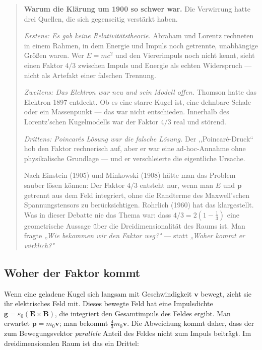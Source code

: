 \begin{quote}
\textbf{Warum die Klärung um 1900 so schwer war.}
Die Verwirrung hatte drei Quellen, die sich gegenseitig verstärkt haben.

\emph{Erstens: Es gab keine Relativitätstheorie.} Abraham und Lorentz
rechneten in einem Rahmen, in dem Energie und Impuls noch getrennte,
unabhängige Größen waren. Wer $E = mc^2$ und den Viererimpuls noch nicht
kennt, sieht einen Faktor $4/3$ zwischen Impuls und Energie als echten
Widerspruch --- nicht als Artefakt einer falschen Trennung.

\emph{Zweitens: Das Elektron war neu und sein Modell offen.} Thomson hatte
das Elektron 1897 entdeckt. Ob es eine starre Kugel ist, eine dehnbare
Schale oder ein Massenpunkt --- das war nicht entschieden. Innerhalb des
Lorentz'schen Kugelmodells war der Faktor $4/3$ real und störend.

\emph{Drittens: Poincarés Lösung war die falsche Lösung.} Der
,,Poincaré-Druck`` hob den Faktor rechnerisch auf, aber er war eine
ad-hoc-Annahme ohne physikalische Grundlage --- und er verschleierte die
eigentliche Ursache.

Nach Einstein (1905) und Minkowski (1908) hätte man das Problem sauber
lösen können: Der Faktor $4/3$ entsteht nur, wenn man $E$ und $\mathbf p$
getrennt aus dem Feld integriert, ohne die Randterme des Maxwell'schen
Spannungstensors zu berücksichtigen. Rohrlich (1960) hat das klargestellt.
Was in dieser Debatte nie das Thema war: dass $4/3 = 2(1-\tfrac{1}{3})$
eine geometrische Aussage über die Dreidimensionalität des Raums ist. Man
fragte \emph{„Wie bekommen wir den Faktor weg?"} --- statt
\emph{„Woher kommt er wirklich?"}
\end{quote}

\subsection{Woher der Faktor kommt \EM}

Wenn eine geladene Kugel sich langsam mit Geschwindigkeit $\mathbf v$ bewegt,
zieht sie ihr elektrisches Feld mit. Dieses bewegte Feld hat eine Impulsdichte
$\mathbf g = \varepsilon_0(\mathbf E\times\mathbf B)$, die integriert den
Gesamtimpuls des Feldes ergibt. Man erwartet $\mathbf p = m_0\mathbf v$; man
bekommt $\frac{4}{3}m_0\mathbf v$. Die Abweichung kommt daher, dass der zum
Bewegungsvektor \emph{parallele} Anteil des Feldes nicht zum Impuls beiträgt.
Im dreidimensionalen Raum ist das ein Drittel:

